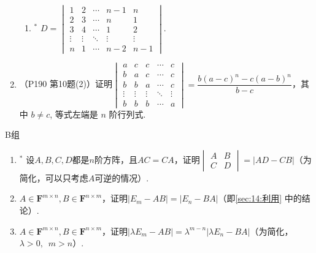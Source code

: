 \begin{enumerate}
\begin{enumerate}
              \item $^*$ $D=\begin{vmatrix}
                            1      & 2      & \cdots & n-1    & n      \\
                            2      & 3      & \cdots & n      & 1      \\
                            3      & 4      & \cdots & 1      & 2      \\
                            \vdots & \vdots & \ddots & \vdots & \vdots \\
                            n      & 1      & \cdots & n-2    & n-1
                        \end{vmatrix}$.
          \end{enumerate}

    \item （P190 第10题(2)）证明$\begin{vmatrix}
                  a      & c      & c      & \cdots & c      \\
                  b      & a      & c      & \cdots & c      \\
                  b      & b      & a      & \cdots & c      \\
                  \vdots & \vdots & \vdots & \ddots & \vdots \\
                  b      & b      & b      & \cdots & a
              \end{vmatrix}=\dfrac{b(a-c)^{n}-c(a-b)^{n}}{b-c}$，其中 $b \neq c$, 等式左端是 $n$ 阶行列式.
\end{enumerate}

\centerline{\heiti B组}
\begin{enumerate}
    \item $^*$ 设$A,B,C,D$都是$n$阶方阵，且$AC=CA$，证明$\begin{vmatrix} A&B \\ C&D \end{vmatrix}=|AD-CB|$（为简化，可以只考虑$A$可逆的情况）.

    \item $A\in \mathbf{F}^{m\times n}, B\in \mathbf{F}^{n\times m}$，证明$|E_m-AB|=|E_n-BA|$（即\autoref{sec:14:利用} 中的结论）.

    \item $A\in \mathbf{F}^{m\times n}, B\in \mathbf{F}^{n\times m}$，证明$|\lambda E_m-AB|=\lambda^{m-n}|\lambda E_n-BA|$（为简化，$\lambda>0,\enspace m>n$）.
\end{enumerate}

